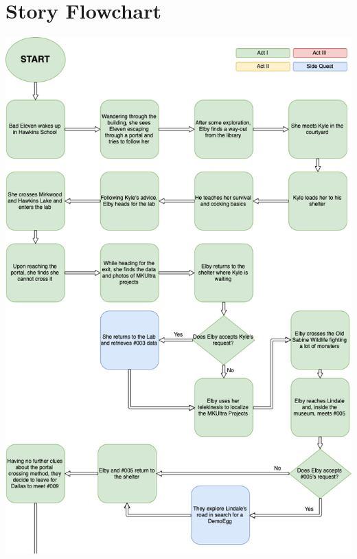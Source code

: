 \section{Story Flowchart}

\vspace*{0.5cm}
\begin{center}
	\includegraphics[width=0.99\linewidth]{images/graphs/story_flowchart_1.png}
\end{center}


